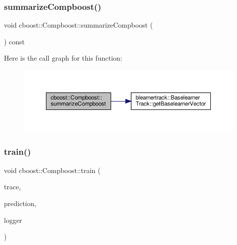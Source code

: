 \subsubsection{\texorpdfstring{summarize\+Compboost()}{summarizeCompboost()}}
{\footnotesize\ttfamily void cboost\+::\+Compboost\+::summarize\+Compboost (\begin{DoxyParamCaption}{ }\end{DoxyParamCaption}) const}

Here is the call graph for this function\+:\nopagebreak
\begin{figure}[H]
\begin{center}
\leavevmode
\includegraphics[width=350pt]{classcboost_1_1_compboost_a7be8cb767054ece895d535c1f468233e_cgraph}
\end{center}
\end{figure}
\mbox{\label{classcboost_1_1_compboost_aa898572eb2c83e0b95c12788a859333b}} 
\subsubsection{\texorpdfstring{train()}{train()}}
{\footnotesize\ttfamily void cboost\+::\+Compboost\+::train (\begin{DoxyParamCaption}\item[{const bool \&}]{trace,  }\item[{const arma\+::vec \&}]{prediction,  }\item[{\hyperlink{classloggerlist_1_1_logger_list}{loggerlist\+::\+Logger\+List} $\ast$}]{logger }\end{DoxyParamCaption})}

